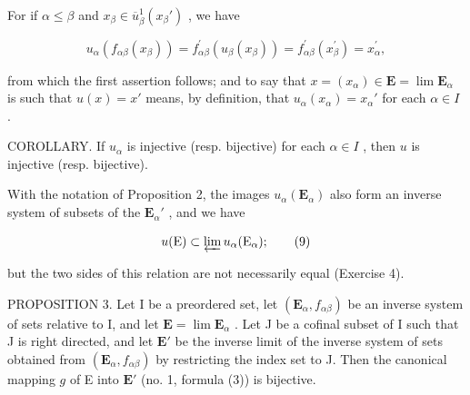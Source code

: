 For if \(\alpha \leqslant \beta\) and \(x_{\beta} \in \overline{u}_{\beta}^{1}(x_{\beta}')\) , we have

\[
u _ {\alpha} (f _ {\alpha \beta} (x _ {\beta})) = f _ {\alpha \beta} ^ {\prime} (u _ {\beta} (x _ {\beta})) = f _ {\alpha \beta} ^ {\prime} (x _ {\beta} ^ {\prime}) = x _ {\alpha} ^ {\prime},
\]

from which the first assertion follows; and to say that \(x = (x_{\alpha}) \in \mathbf{E} = \lim \mathbf{E}_{\alpha}\) is such that \(u(x) = x'\) means, by definition, that \(u_{\alpha}(x_{\alpha}) = x_{\alpha}'\) for each \(\alpha \in I\) .

COROLLARY. If \(u_{\alpha}\) is injective (resp. bijective) for each \(\alpha \in I\) , then \(u\) is injective (resp. bijective).

With the notation of Proposition 2, the images \(u_{\alpha}(\mathbf{E}_{\alpha})\) also form an inverse system of subsets of the \(\mathbf{E}_{\alpha}'\) , and we have

\[
u (\mathrm{E}) \subset \varprojlim u _ {\alpha} (\mathrm{E} _ {\alpha});\tag{9}
\]

but the two sides of this relation are not necessarily equal (Exercise 4).

PROPOSITION 3. Let I be a preordered set, let \((\mathbf{E}_{\alpha}, f_{\alpha \beta})\) be an inverse system of sets relative to I, and let \(\mathbf{E} = \lim \mathbf{E}_{\alpha}\) . Let J be a cofinal subset of I such that J is right directed, and let \(\mathbf{E}'\) be the inverse limit of the inverse system of sets obtained from \((\mathbf{E}_{\alpha}, f_{\alpha \beta})\) by restricting the index set to J. Then the canonical mapping \(g\) of E into \(\mathbf{E}'\) (no. 1, formula (3)) is bijective.

